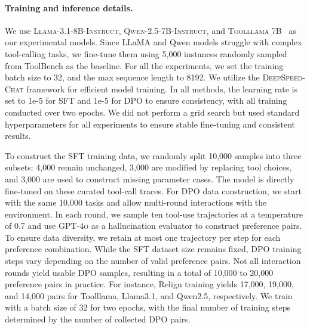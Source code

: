 

\paragraph{Training and inference details.}
We use \textsc{Llama-3.1-8B-Instruct}, \textsc{Qwen-2.5-7B-Instruct}, and \textsc{Toolllama 7B}~\cite{qin2023toolllm} as our experimental models. Since LLaMA and Qwen models struggle with complex tool-calling tasks, we fine-tune them using 5,000 instances randomly sampled from ToolBench as the baseline. For all the experiments, we set the training batch size to 32, and the max sequence length to 8192. We utilize the \textsc{DeepSpeed-Chat} framework for efficient model training.  In all methods, the learning rate is set to 1e-5 for SFT and 1e-5 for DPO to ensure consistency, with all training conducted over two epochs. We did not perform a grid search but used standard hyperparameters for all experiments to ensure stable fine-tuning and consistent results.

To construct the SFT training data, we randomly split 10,000 samples into three subsets: 4,000 remain unchanged, 3,000 are modified by replacing tool choices, and 3,000 are used to construct missing parameter cases. The model is directly fine-tuned on these curated tool-call traces. For DPO data construction, we start with the same 10,000 tasks and allow multi-round interactions with the environment. In each round, we sample ten tool-use trajectories at a temperature of 0.7 and use \textsc{GPT-4o} as a hallucination evaluator to construct preference pairs. To ensure data diversity, we retain at most one trajectory per step for each preference combination. While the SFT dataset size remains fixed, DPO training steps vary depending on the number of valid preference pairs. Not all interaction rounds yield usable DPO samples, resulting in a total of 10,000 to 20,000 preference pairs in practice. For instance, Relign training yields 17,000, 19,000, and 14,000 pairs for Toolllama, Llama3.1, and Qwen2.5, respectively. We train with a batch size of 32 for two epochs, with the final number of training steps determined by the number of collected DPO pairs.

